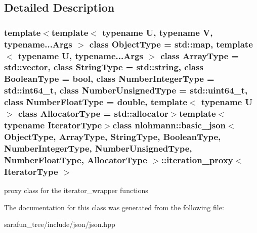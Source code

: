 \subsection{Detailed Description}
\subsubsection*{template$<$template$<$ typename U, typename V, typename...\-Args $>$ class Object\-Type = std\-::map, template$<$ typename U, typename...\-Args $>$ class Array\-Type = std\-::vector, class String\-Type = std\-::string, class Boolean\-Type = bool, class Number\-Integer\-Type = std\-::int64\-\_\-t, class Number\-Unsigned\-Type = std\-::uint64\-\_\-t, class Number\-Float\-Type = double, template$<$ typename U $>$ class Allocator\-Type = std\-::allocator$>$template$<$typename Iterator\-Type$>$class nlohmann\-::basic\-\_\-json$<$ Object\-Type, Array\-Type, String\-Type, Boolean\-Type, Number\-Integer\-Type, Number\-Unsigned\-Type, Number\-Float\-Type, Allocator\-Type $>$\-::iteration\-\_\-proxy$<$ Iterator\-Type $>$}

proxy class for the iterator\-\_\-wrapper functions 

The documentation for this class was generated from the following file\-:\begin{DoxyCompactItemize}
\item 
sarafun\-\_\-tree/include/json/json.\-hpp\end{DoxyCompactItemize}
